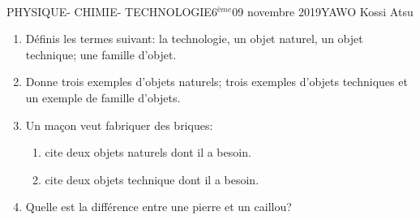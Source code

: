 \documentclass[12pt,a4paper]{book}
\newcommand{\prof}{YAWO Kossi Atsu}
\newcommand{\matiere}{\\PHYSIQUE- CHIMIE- TECHNOLOGIE}
\newcommand{\classe}{6$^{ème}$}
\begin{document}
\begin{td}{\matiere}{\classe}{09 novembre 2019}{\prof}
\vspace{0.5cm}
\begin{exo}
\begin{enumerate}
\item Définis les termes suivant: la technologie, un objet naturel, un objet technique; une famille d'objet.
\item Donne trois exemples d'objets naturels; trois exemples d'objets techniques et un exemple de famille d'objets.
\item Un maçon veut fabriquer des briques:
\begin{enumerate}
\item cite deux objets naturels dont il a besoin.
\item cite deux objets technique dont il a besoin.
\end{enumerate}
\item Quelle est la différence entre une pierre et un caillou?
\end{enumerate}
\end{exo}
\end{td}
\end{document}
